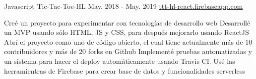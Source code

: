 \begin{cventries}
{\begin{cvitems}
{{        }}
      \end{cvitems}
    }
  \cventry
    {Javascript}
    {Tic-Tac-Toe-HL} %
    {May. 2018 - May. 2019} %
    {\url{ttt-hl-react.firebaseapp.com}} %
    {
      \begin{cvitems} %
         {{
          Creé un proyecto para experimentar con tecnologías de desarrollo web
        }}
         {{
          Desarrollé un MVP usando sólo HTML, JS y CSS, para después mejorarlo usando ReactJS
        }}
         {{
          Abrí el proyecto como uno de código abierto, el cual tiene actualmente más de 10 contribuidores y más de 20 forks en Github
        }}
         {{
          Implementé pruebas automatizadas y un sistema para hacer el deploy automáticamente usando Travis CI.
        }}
         {{
          Usé las herramientras de Firebase para crear base de datos y funcionalidades serverless
        }}
      \end{cvitems}
    }



\end{cventries}
